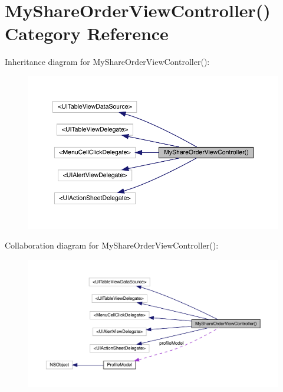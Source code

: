 \hypertarget{category_my_share_order_view_controller_07_08}{}\section{My\+Share\+Order\+View\+Controller() Category Reference}
\label{category_my_share_order_view_controller_07_08}


Inheritance diagram for My\+Share\+Order\+View\+Controller()\+:\nopagebreak
\begin{figure}[H]
\begin{center}
\leavevmode
\includegraphics[width=350pt]{category_my_share_order_view_controller_07_08__inherit__graph}
\end{center}
\end{figure}


Collaboration diagram for My\+Share\+Order\+View\+Controller()\+:\nopagebreak
\begin{figure}[H]
\begin{center}
\leavevmode
\includegraphics[width=350pt]{category_my_share_order_view_controller_07_08__coll__graph}
\end{center}
\end{figure}
